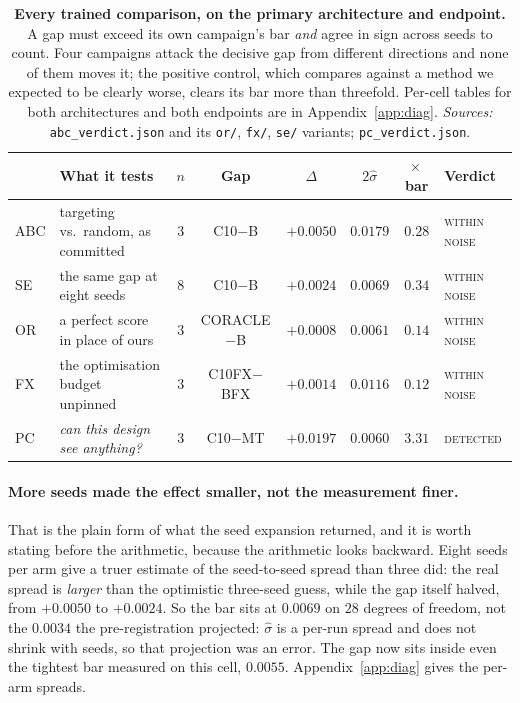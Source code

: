 \documentclass{article}
\begin{document}
\begin{table}[t]
\caption{\textbf{Every trained comparison, on the primary architecture and endpoint.} A gap must
exceed its own campaign's bar \emph{and} agree in sign across seeds to count. Four campaigns attack
the decisive gap from different directions and none of them moves it; the positive control, which
compares against a method we expected to be clearly worse, clears its bar more than threefold.
Per-cell tables for both architectures and both endpoints are in Appendix~\ref{app:diag}.
\emph{Sources:} \texttt{abc\_verdict.json} and its \texttt{or/}, \texttt{fx/}, \texttt{se/}
variants; \texttt{pc\_verdict.json}.}
\label{tab:trained}
\begin{center}
\small
\setlength{\tabcolsep}{4pt}
\begin{tabular}{@{}llcccccl@{}}
\toprule
& What it tests & $n$ & Gap & $\Delta$ & $2\hat{\sigma}$ & $\times$\,bar & Verdict \\
\midrule
ABC & targeting vs.\ random, as committed & $3$ & C10$-$B & $+0.0050$ & $0.0179$ & $0.28$ & \textsc{within noise} \\
SE & the same gap at eight seeds & $8$ & C10$-$B & $+0.0024$ & $0.0069$ & $0.34$ & \textsc{within noise} \\
OR & a perfect score in place of ours & $3$ & CORACLE$-$B & $+0.0008$ & $0.0061$ & $0.14$ & \textsc{within noise} \\
FX & the optimisation budget unpinned & $3$ & C10FX$-$BFX & $+0.0014$ & $0.0116$ & $0.12$ & \textsc{within noise} \\
\midrule
PC & \emph{can this design see anything?} & $3$ & C10$-$MT & $+0.0197$ & $0.0060$ & $\mathbf{3.31}$ & \textsc{detected} \\
\bottomrule
\end{tabular}
\end{center}
\end{table}

\paragraph{More seeds made the effect smaller, not the measurement finer.} That is the plain form of
what the seed expansion returned, and it is worth stating before the arithmetic, because the
arithmetic looks backward. Eight seeds per arm give a truer estimate of the seed-to-seed spread
than three did: the real spread is \emph{larger} than the optimistic three-seed guess, while the gap
itself halved, from $+0.0050$ to $+0.0024$. So the bar sits at $0.0069$ on $28$ degrees of freedom,
not the $0.0034$ the pre-registration projected: $\hat{\sigma}$ is a per-run spread and does not
shrink with seeds, so that projection was an error. The gap now sits inside even the tightest bar
measured on this cell, $0.0055$.
Appendix~\ref{app:diag} gives the per-arm spreads.
\end{document}
